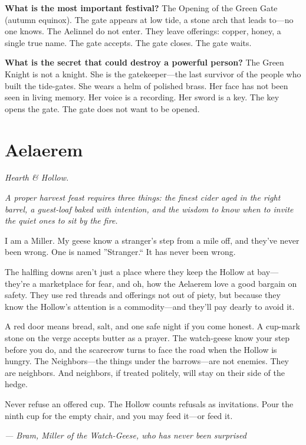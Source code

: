 \begin{almanac}
\textbf{What is the most important festival?} The Opening of the Green Gate (autumn equinox). The gate appears at low tide, a stone arch that leads to---no one knows. The Aelinnel do not enter. They leave offerings: copper, honey, a single true name. The gate accepts. The gate closes. The gate waits.

\textbf{What is the secret that could destroy a powerful person?} The Green Knight is not a knight. She is the gatekeeper---the last survivor of the people who built the tide-gates. She wears a helm of polished brass. Her face has not been seen in living memory. Her voice is a recording. Her sword is a key. The key opens the gate. The gate does not want to be opened.
\end{almanac}

\newpage

\newpage

\chapter{Aelaerem}
\emph{Hearth \& Hollow.}

\noindent
{\Large
\textit{A proper harvest feast requires three things: the finest cider aged in the right barrel, a guest-loaf baked with intention, and the wisdom to know when to invite the quiet ones to sit by the fire.}

\vspace{0.5em}

I am a Miller. My geese know a stranger's step from a mile off, and they've never been wrong. One is named ''Stranger.`` It has never been wrong.

\vspace{0.5em}

The halfling downs aren't just a place where they keep the Hollow at bay---they're a marketplace for fear, and oh, how the Aelaerem love a good bargain on safety. They use red threads and offerings not out of piety, but because they know the Hollow's attention is a commodity---and they'll pay dearly to avoid it.

\vspace{0.5em}

A red door means bread, salt, and one safe night if you come honest. A cup-mark stone on the verge accepts butter as a prayer. The watch-geese know your step before you do, and the scarecrow turns to face the road when the Hollow is hungry. The Neighbors---the things under the barrows---are not enemies. They are neighbors. And neighbors, if treated politely, will stay on their side of the hedge.

\vspace{0.5em}

Never refuse an offered cup. The Hollow counts refusals as invitations. Pour the ninth cup for the empty chair, and you may feed it---or feed it.

\vspace{1em}

\noindent\textit{--- Bram, Miller of the Watch-Geese, who has never been surprised}
}

